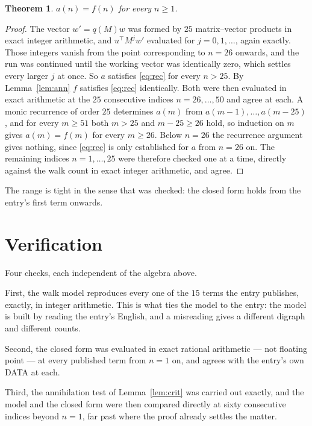 \documentclass[11pt,a4paper]{article}
\theoremstyle{plain}
\newtheorem{theorem}{Theorem}
\theoremstyle{definition}
\begin{document}
\begin{theorem}
$a(n)=f(n)$ for every $n\ge1$.
\end{theorem}

\begin{proof}
The vector $w'=q(M)w$ was formed by $25$ matrix--vector products in exact integer
arithmetic, and $u^{\!\top}M^{j}w'$ evaluated for $j=0,1,\dots$, again exactly. Those integers
vanish from the point corresponding to $n=26$ onwards, and the run was continued until the
working vector was identically zero, which settles every larger $j$ at once. So $a$ satisfies
\eqref{eq:rec} for every $n>25$. By Lemma~\ref{lem:ann} $f$ satisfies \eqref{eq:rec}
identically. Both were then evaluated in exact arithmetic at the $25$ consecutive indices
$n=26,\dots,50$ and agree at each. A monic recurrence of order $25$
determines $a(m)$ from $a(m-1),\dots,a(m-25)$, and for every $m\ge51$ both
$m>25$ and $m-25\ge26$ hold, so induction on $m$ gives $a(m)=f(m)$ for every
$m\ge26$.
Below $n=26$ the recurrence argument gives nothing, since \eqref{eq:rec} is only
established for $a$ from $n=26$ on. The remaining indices $n=1,\dots,25$ were
therefore checked one at a time, directly against the walk count in exact integer arithmetic,
and agree.
\end{proof}

The range is tight in the sense that was checked: the closed form holds from the entry's first term onwards.

\section{Verification}

Four checks, each independent of the algebra above.

First, the walk model reproduces every one of the $15$ terms the entry publishes,
exactly, in integer arithmetic. This is what ties the model to the entry: the model is built
by reading the entry's English, and a misreading gives a different digraph and different
counts.

Second, the closed form was evaluated in exact rational arithmetic --- not floating point ---
at every published term from $n=1$ on, and agrees with the entry's own DATA at each.

Third, the annihilation test of Lemma~\ref{lem:crit} was carried out exactly, and the model
and the closed form were then compared directly at sixty consecutive indices beyond
$n=1$, far past where the proof already settles the matter.
\end{document}
